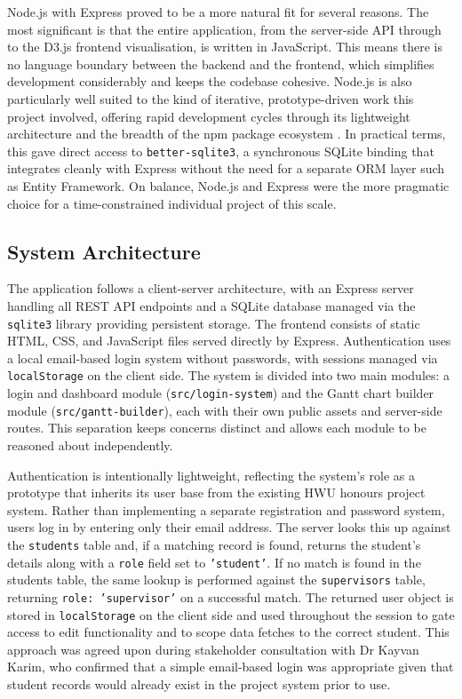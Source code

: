 \documentclass[12pt,nonacm,acmlarge,titlepage,screen]{acmart}
\begin{document}
Node.js with Express proved to be a more natural fit for several reasons. The most significant is that the entire application, from the server-side API through to the D3.js frontend visualisation, is written in JavaScript. This means there is no language boundary between the backend and the frontend, which simplifies development considerably and keeps the codebase cohesive. Node.js is also particularly well suited to the kind of iterative, prototype-driven work this project involved, offering rapid development cycles through its lightweight architecture and the breadth of the npm package ecosystem \cite{leobit_nodejs_aspnet_2025}. In practical terms, this gave direct access to \texttt{better-sqlite3}, a synchronous SQLite binding that integrates cleanly with Express without the need for a separate ORM layer such as Entity Framework. On balance, Node.js and Express were the more pragmatic choice for a time-constrained individual project of this scale.

\subsection{System Architecture} \label{sec:impl_arch}

The application follows a client-server architecture, with an Express server handling all REST API endpoints and a SQLite database managed via the \texttt{sqlite3} library providing persistent storage. The frontend consists of static HTML, CSS, and JavaScript files served directly by Express. Authentication uses a local email-based login system without passwords, with sessions managed via \texttt{localStorage} on the client side. The system is divided into two main modules: a login and dashboard module (\texttt{src/login-system}) and the Gantt chart builder module (\texttt{src/gantt-builder}), each with their own public assets and server-side routes. This separation keeps concerns distinct and allows each module to be reasoned about independently.

Authentication is intentionally lightweight, reflecting the system's role as a 
prototype that inherits its user base from the existing HWU honours project system. 
Rather than implementing a separate registration and password system, users log in 
by entering only their email address. The server looks this up against the 
\texttt{students} table and, if a matching record is found, returns the student's 
details along with a \texttt{role} field set to \texttt{'student'}. If no match is 
found in the students table, the same lookup is performed against the 
\texttt{supervisors} table, returning \texttt{role: 'supervisor'} on a successful 
match. The returned user object is stored in \texttt{localStorage} on the client 
side and used throughout the session to gate access to edit functionality and to 
scope data fetches to the correct student. This approach was agreed upon during 
stakeholder consultation with Dr Kayvan Karim, who confirmed that a simple 
email-based login was appropriate given that student records would already exist 
in the project system prior to use.
\end{document}
